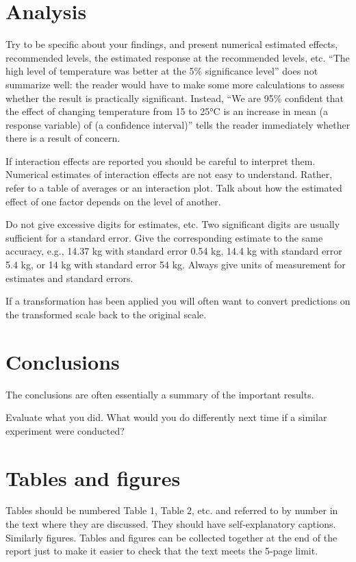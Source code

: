 \documentclass[12pt,a4paper]{article}
\begin{document}
\section{Analysis}

Try to be specific about your findings, and present numerical
estimated effects, recommended levels, the estimated response at the recommended levels,
etc. ``The high level of temperature was better at the 5\% significance level'' does not
summarize well: the reader would have to make some more calculations to assess whether
the result is practically significant. Instead, ``We are 95\% confident that the effect of
changing temperature from 15 to 25°C is an increase in mean (a response variable) of (a
confidence interval)'' tells the reader immediately whether there is a result of concern.

If interaction effects are reported you should be careful to interpret them. Numerical
estimates of interaction effects are not easy to understand. Rather, refer to a table of
averages or an interaction plot. Talk about how the estimated effect of one factor depends
on the level of another.

Do not give excessive digits for estimates, etc. Two significant digits are usually suﬀicient
for a standard error. Give the corresponding estimate to the same accuracy, e.g., 14.37 kg
with standard error 0.54 kg, 14.4 kg with standard error 5.4 kg, or 14 kg with standard
error 54 kg. Always give units of measurement for estimates and standard errors.

If a transformation has been applied you will often want to convert predictions on the
transformed scale back to the original scale.

\section{Conclusions}

The conclusions are often essentially a summary of the
important results.

Evaluate what you did. What would you do differently next time if a similar experiment
were conducted?

\section{Tables and figures}

Tables should be numbered Table 1, Table 2, etc. and referred
to by number in the text where they are discussed. They should have self-explanatory
captions. Similarly figures. Tables and figures can be collected together at the end of the
report just to make it easier to check that the text meets the 5-page limit.
\end{document}

